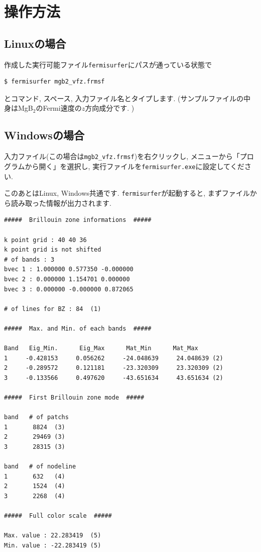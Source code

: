 \documentclass[12pt]{jarticle}
\begin{document}
\section{操作方法}

\subsection{Linuxの場合}
作成した実行可能ファイル\verb|fermisurfer|にパスが通っている状態で
\begin{verbatim}
$ fermisurfer mgb2_vfz.frmsf
\end{verbatim}
とコマンド, スペース, 入力ファイル名とタイプします. 
(サンプルファイルの中身はMgB$_2$のFermi速度の$z$方向成分です. )

\subsection{Windowsの場合}

入力ファイル(この場合は\verb|mgb2_vfz.frmsf|)を右クリックし,
メニューから「プログラムから開く」を選択し,
実行ファイルを\verb|fermisurfer.exe|に設定してください.

\vspace{0.5cm}
このあとはLinux, Windows共通です.
\verb|fermisurfer|が起動すると,
まずファイルから読み取った情報が出力されます. 

\begin{verbatim}
#####  Brillouin zone informations  ##### 

k point grid : 40 40 36 
k point grid is not shifted 
# of bands : 3 
bvec 1 : 1.000000 0.577350 -0.000000 
bvec 2 : 0.000000 1.154701 0.000000 
bvec 3 : 0.000000 -0.000000 0.872065 

# of lines for BZ : 84  (1)

#####  Max. and Min. of each bands  ##### 
     
Band   Eig_Min.      Eig_Max      Mat_Min      Mat_Max 
1     -0.428153     0.056262     -24.048639     24.048639 (2)
2     -0.289572     0.121181     -23.320309     23.320309 (2)
3     -0.133566     0.497620     -43.651634     43.651634 (2)

#####  First Brillouin zone mode  #####

band   # of patchs
1       8824  (3)
2       29469 (3)
3       28315 (3)

band   # of nodeline 
1       632   (4)
2       1524  (4)
3       2268  (4)

#####  Full color scale  ##### 

Max. value : 22.283419  (5)
Min. value : -22.283419 (5) 

\end{verbatim}
\end{document}
